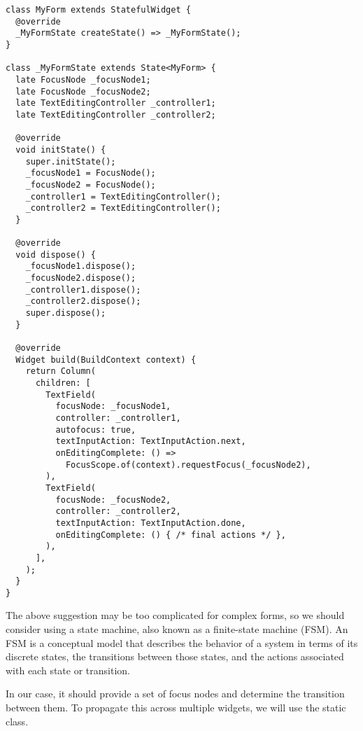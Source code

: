\begin{lstlisting}
class MyForm extends StatefulWidget {
  @override
  _MyFormState createState() => _MyFormState();
}

class _MyFormState extends State<MyForm> {
  late FocusNode _focusNode1;
  late FocusNode _focusNode2;
  late TextEditingController _controller1;
  late TextEditingController _controller2;

  @override
  void initState() {
    super.initState();
    _focusNode1 = FocusNode();
    _focusNode2 = FocusNode();
    _controller1 = TextEditingController();
    _controller2 = TextEditingController();
  }

  @override
  void dispose() {
    _focusNode1.dispose();
    _focusNode2.dispose();
    _controller1.dispose();
    _controller2.dispose();
    super.dispose();
  }

  @override
  Widget build(BuildContext context) {
    return Column(
      children: [
        TextField(
          focusNode: _focusNode1,
          controller: _controller1,
          autofocus: true,
          textInputAction: TextInputAction.next,
          onEditingComplete: () =>
            FocusScope.of(context).requestFocus(_focusNode2),
        ),
        TextField(
          focusNode: _focusNode2,
          controller: _controller2,
          textInputAction: TextInputAction.done,
          onEditingComplete: () { /* final actions */ },
        ),
      ],
    );
  }
}
\end{lstlisting}

\noindent The above suggestion may be too complicated for complex forms, so we should consider using a state machine, 
also known as a finite-state machine (FSM). An FSM is a conceptual model that describes the behavior of a system in 
terms of its discrete states, the transitions between those states, and the actions associated with each state or 
transition.

In our case, it should provide a set of focus nodes and determine the transition between them. To propagate this across 
multiple widgets, we will use the static class.

